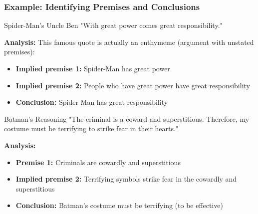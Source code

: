 \documentclass{beamer}
\begin{document}
\begin{frame}
    \frametitle{Example: Identifying Premises and Conclusions}
    
    \begin{exampleblock}{Spider-Man's Uncle Ben}
    \scriptsize
        "With great power comes great responsibility."
        
        \textbf{Analysis:} This famous quote is actually an enthymeme (argument with unstated premises):
        \begin{itemize}
            \item \textbf{Implied premise 1:} Spider-Man has great power
            \item \textbf{Implied premise 2:} People who have great power have great responsibility
            \item \textbf{Conclusion:} Spider-Man has great responsibility
        \end{itemize}
    \end{exampleblock}
    
    \begin{exampleblock}{Batman's Reasoning}
    \scriptsize
        "The criminal is a coward and superstitious. Therefore, my costume must be terrifying to strike fear in their hearts."
        
        \textbf{Analysis:}
        \begin{itemize}
            \item \textbf{Premise 1:} Criminals are cowardly and superstitious
            \item \textbf{Implied premise 2:} Terrifying symbols strike fear in the cowardly and superstitious
            \item \textbf{Conclusion:} Batman's costume must be terrifying (to be effective)
        \end{itemize}
    \end{exampleblock}
\end{frame}
\end{document}

